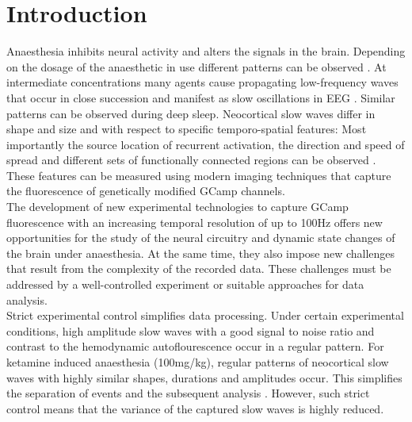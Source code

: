 
\chapter{Introduction} %

\label{Chapter1} %
\newcommand{\keyword}[1]{\textbf{#1}}
\newcommand{\tabhead}[1]{\textbf{#1}}
\newcommand{\code}[1]{\texttt{#1}}
\newcommand{\file}[1]{\texttt{\bfseries#1}}
\newcommand{\option}[1]{\texttt{\itshape#1}}
Anaesthesia inhibits neural activity and alters the signals in the brain. Depending on the dosage of the anaesthetic in use different patterns can be observed \parencite{eger1981isoflurane}. At intermediate concentrations many agents cause propagating low-frequency waves that occur in close succession and manifest as slow oscillations in EEG \parencite{steriade1993novel, eger1981isoflurane}. Similar patterns can be observed during deep sleep. Neocortical slow waves differ in shape and size and with respect to specific temporo-spatial features: Most importantly the source location of recurrent activation, the direction and speed of spread and different sets of functionally connected regions can be observed \parencite{brown2012control}. These features can be measured using modern imaging techniques that capture the fluorescence of genetically modified GCamp channels.\\
The development of new experimental technologies to capture GCamp fluorescence with an increasing temporal resolution of up to 100Hz offers new opportunities for the study of the neural circuitry and dynamic state changes of the brain under anaesthesia. At the same time, they also impose new challenges that result from the complexity of the recorded data. These challenges must be addressed by a well-controlled experiment or suitable approaches for data analysis.\\
Strict experimental control simplifies data processing. Under certain experimental conditions, high amplitude slow waves with a good signal to noise ratio and contrast to the hemodynamic autoflourescence occur in a regular pattern. For ketamine induced anaesthesia (100mg/kg), regular patterns of neocortical slow waves with highly similar shapes, durations and amplitudes occur. This simplifies the separation of events and the subsequent analysis \parencite{celotto2020analysis}. However, such strict control means that the variance of the captured slow waves is highly reduced.\\
